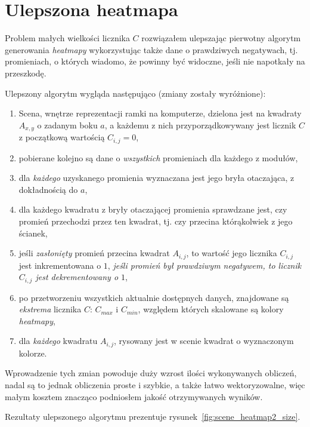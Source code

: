 \section{Ulepszona heatmapa}

Problem małych wielkości licznika $C$ rozwiązałem ulepszając pierwotny algorytm generowania \textit{heatmapy} wykorzystując także dane o prawdziwych negatywach, tj. promieniach, o których wiadomo, że powinny być widoczne, jeśli nie napotkały na przeszkodę.

Ulepszony algorytm wygląda następująco (zmiany zostały wyróżnione):
\begin{enumerate}
 \item Scena, wnętrze reprezentacji ramki na komputerze, dzielona jest na kwadraty $A_{x,y}$ o zadanym boku $a$, a każdemu z nich przyporządkowywany jest licznik $C$ z początkową wartością $C_{i,j} = 0$,
 \item pobierane kolejno są dane o \textit{wszystkich} promieniach dla każdego z modułów,
 \item dla \textit{każdego} uzyskanego promienia wyznaczana jest jego bryła otaczająca, z dokładnością do $a$,
 \item dla każdego kwadratu z bryły otaczającej promienia sprawdzane jest, czy promień przechodzi przez ten kwadrat, tj. czy przecina którąkolwiek z jego ścianek,
 \item jeśli \textit{zasłonięty} promień przecina kwadrat $A_{i,j}$, to wartość jego licznika $C_{i,j}$ jest inkrementowana o $1$, \textit{jeśli promień był prawdziwym negatywem, to licznik $C_{i,j}$ jest dekrementowany o $1$},
 \item po przetworzeniu wszystkich aktualnie dostępnych danych, znajdowane są \textit{ekstrema} licznika $C$: $C_{max}$ i $C_{min}$, względem których skalowane są kolory \textit{heatmapy},
 \item dla \textit{każdego} kwadratu $A_{i,j}$, rysowany jest w scenie kwadrat o wyznaczonym kolorze.\\
\end{enumerate}

Wprowadzenie tych zmian powoduje duży wzrost ilości wykonywanych obliczeń, nadal są to jednak obliczenia proste i szybkie, a także łatwo wektoryzowalne, więc małym kosztem znacząco podniosłem jakość otrzymywanych wyników.

Rezultaty ulepszonego algorytmu prezentuje rysunek~\ref{fig:scene_heatmap2_size}.

